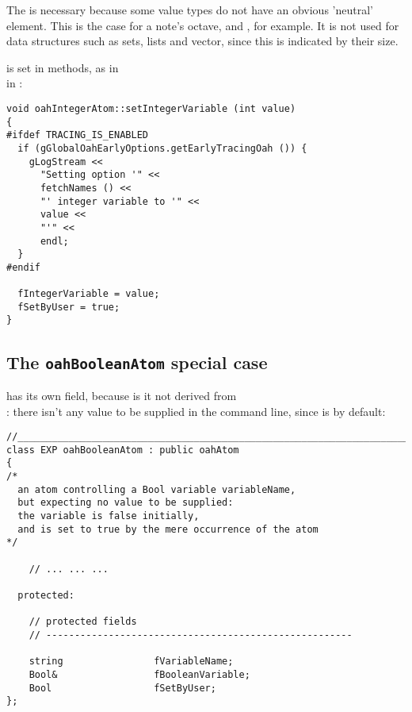 The  is necessary because some value types do not have an obvious 'neutral' element. This is the case for a note's octave,  and , for example. It is not used for data structures such as sets, lists and vector, since this is indicated by their size.

 is set in  methods, as in \\
in :
\begin{lstlisting}[language=CPlusPlus]
void oahIntegerAtom::setIntegerVariable (int value)
{
#ifdef TRACING_IS_ENABLED
  if (gGlobalOahEarlyOptions.getEarlyTracingOah ()) {
    gLogStream <<
      "Setting option '" <<
      fetchNames () <<
      "' integer variable to '" <<
      value <<
      "'" <<
      endl;
  }
#endif

  fIntegerVariable = value;
  fSetByUser = true;
}
\end{lstlisting}


\subsection{The {\tt oahBooleanAtom} special case}

 has its own  field, because is it not derived from\\
: there isn't any value to be supplied in the command line, since  is  by default:
\begin{lstlisting}[language=CPlusPlus]
//______________________________________________________________________________
class EXP oahBooleanAtom : public oahAtom
{
/*
  an atom controlling a Bool variable variableName,
  but expecting no value to be supplied:
  the variable is false initially,
  and is set to true by the mere occurrence of the atom
*/

	// ... ... ...

  protected:

    // protected fields
    // ------------------------------------------------------

    string                fVariableName;
    Bool&                 fBooleanVariable;
    Bool                  fSetByUser;
};
\end{lstlisting}


